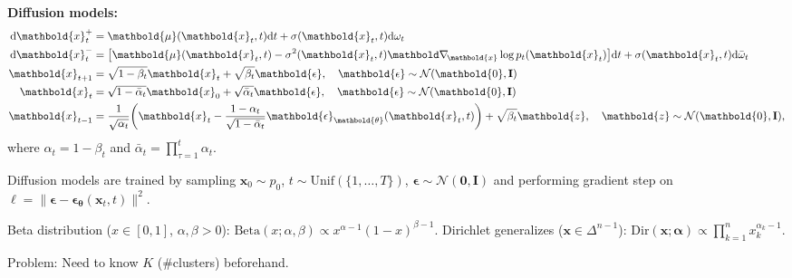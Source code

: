 \documentclass[9pt]{extarticle}
\newenvironment{topic}[1]
{\textbf{\sffamily \colorbox{black}{\rlap{\textbf{\textcolor{white}{#1}}}\hspace{\linewidth}\hspace{-2\fboxsep}}}}
{}
\newenvironment{subtopic}[1]
{\textbf{\sffamily #1:}}
{}
\renewcommand{\mat}[1]{\ensuremath{\mathbf{#1}}}
\renewcommand{\vec}[1]{\ensuremath{\mathbold{#1}}}
\begin{document}
\begin{multicols*}{3}
\begin{topic}{Stable diffusion}
        \begin{subtopic}{Diffusion models}
            {\footnotesize \begin{align*}
                \mathrm{d}\vec{x}^+_t & = \vec{\mu}(\vec{x}_t, t) \mathrm{d}t + \sigma(\vec{x}_t, t) \mathrm{d}\omega_t                                                                                \\
                \mathrm{d}\vec{x}^-_t & = \lft[ \vec{\mu}(\vec{x}_t, t) - \sigma^2(\vec{x}_t, t) \grad{\log p_t(\vec{x}_t)}{\vec{x}} \rgt] \mathrm{d}t + \sigma(\vec{x}_t, t) \mathrm{d}\bar{\omega}_t \\
                \vec{x}_{t+1}         & = \sqrt{1-\beta_t} \vec{x}_t + \sqrt{\beta_t} \vec{\epsilon}, \quad \vec{\epsilon} \sim \mathcal{N}(\vec{0}, \mat{I})                                          \\
                \vec{x}_t             & = \sqrt{1-\bar{\alpha}_t} \vec{x}_0 + \sqrt{\bar{\alpha}_t} \vec{\epsilon}, \quad \vec{\epsilon} \sim \mathcal{N}(\vec{0}, \mat{I})                                                                                     \\
                \vec{x}_{t-1}         & = \frac{1}{\sqrt{\alpha_t}} \lft( \vec{x}_t - \frac{1-\alpha_t}{\sqrt{1-\bar{\alpha}_t}} \vec{\epsilon}_{\vec{\theta}}(\vec{x}_t, t) \rgt) + \sqrt{\beta_t} \vec{z}, \quad \vec{z} \sim \mathcal{N}(\vec{0}, \mat{I}),
            \end{align*}}
            where $\alpha_t = 1-\beta_t$ and $\bar{\alpha}_t = \prod_{\tau=1}^t \alpha_t$.

            Diffusion models are trained by sampling $\vec{x}_0 \sim p_0$, $t \sim \mathrm{Unif}(\{ 1, \ldots,
                T \})$, $\vec{\epsilon} \sim \mathcal{N}(\vec{0}, \mat{I})$ and performing gradient step on $\ell =
                \| \vec{\epsilon} - \vec{\epsilon}_{\vec{\theta}}(\vec{x}_t, t) \|^2$.
        \end{subtopic}

    \end{topic}

    \begin{topic}{Non-parametric Bayesian methods}
        Beta distribution ($x \in [0,1]$, $\alpha,\beta > 0$): $\mathrm{Beta}(x; \alpha, \beta) \propto
            x^{\alpha-1} (1-x)^{\beta-1}$. Dirichlet generalizes ($\vec{x} \in \Delta^{n-1}$):
        $\mathrm{Dir}(\vec{x}; \vec{\alpha}) \propto \prod_{k=1}^n x_k^{\alpha_k - 1}$.

        Problem: Need to know $K$ (\#clusters) beforehand.


\end{topic}
\end{multicols*}
\end{document}
